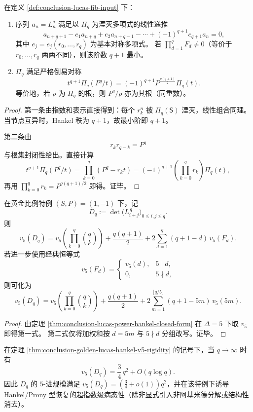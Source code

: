\begin{proposition}[最小递推与倒易对称]\label{prop:conclusion-lucas-power-minpoly-reciprocity}
在定义 \ref{def:conclusion-lucas-fib-input} 下：
\begin{enumerate}
  \item 序列 \(a_n=L_n^q\) 满足以 \(\Pi_q\) 为湮灭多项式的线性递推
  \[
  a_{n+q+1}
  -e_1 a_{n+q}
  +e_2 a_{n+q-1}
  -\cdots
  +(-1)^{q+1}e_{q+1}a_n=0,
  \]
  其中 \(e_j=e_j(r_0,\dots,r_q)\) 为基本对称多项式。
  若 \(\prod_{d=1}^{q}F_d\neq 0\)（等价于 \(r_0,\dots,r_q\) 两两不同），则该阶数 \(q+1\) 最小。
  \item \(\Pi_q\) 满足严格倒易对称
  \[
  t^{q+1}\Pi_q(P^q/t)
  =
  (-1)^{q+1}P^{\frac{q(q+1)}{2}}\Pi_q(t).
  \]
  等价地，若 \(\rho\) 为 \(\Pi_q\) 的根，则 \(P^q/\rho\) 亦为其根（同重数）。
\end{enumerate}
\end{proposition}
\begin{proof}
第一条由指数和表示直接得到：每个 \(r_k^n\) 被 \(\Pi_q(\mathsf S)\) 湮灭，线性组合同理。
当节点互异时，Hankel 秩为 \(q+1\)，故最小阶即 \(q+1\)。

第二条由
\[
r_k r_{q-k}=P^q
\]
与根集封闭性给出。直接计算
\[
t^{q+1}\Pi_q(P^q/t)
=\prod_{k=0}^{q}(P^q-r_kt)
=(-1)^{q+1}\left(\prod_{k=0}^{q}r_k\right)\Pi_q(t),
\]
再用
\(
\prod_{k=0}^{q}r_k=P^{q(q+1)/2}
\)
即得。证毕。
\end{proof}

\begin{theorem}\label{thm:conclusion-golden-lucas-hankel-v5-rigidity}
在黄金比例特例 \((S,P)=(1,-1)\) 下，记
\[
D_q:=\det\!\big(L_{i+j}^{\,q}\big)_{0\le i,j\le q}.
\]
则
\[
v_5(D_q)
=
v_5\!\left(\prod_{k=0}^{q}\binom{q}{k}\right)
+\frac{q(q+1)}{2}
+2\sum_{d=1}^{q}(q+1-d)\,v_5(F_d).
\]
若进一步使用经典恒等式
\[
v_5(F_d)=
\begin{cases}
v_5(d),&5\mid d,\\
0,&5\nmid d,
\end{cases}
\]
则可化为
\[
v_5(D_q)
=
v_5\!\left(\prod_{k=0}^{q}\binom{q}{k}\right)
+\frac{q(q+1)}{2}
+2\sum_{m=1}^{\lfloor q/5\rfloor}(q+1-5m)\,v_5(5m).
\]
\end{theorem}
\begin{proof}
由定理 \ref{thm:conclusion-lucas-power-hankel-closed-form} 在 \(\Delta=5\) 下取 \(v_5\) 即得第一式。
第二式仅将加权和按 \(d=5m\) 与 \(5\nmid d\) 分组改写。证毕。
\end{proof}

\begin{corollary}\label{cor:conclusion-golden-lucas-hankel-v5-quadratic-growth}
在定理 \ref{thm:conclusion-golden-lucas-hankel-v5-rigidity} 的记号下，当 \(q\to\infty\) 时有
\[
v_5(D_q)=\frac34\,q^2+O(q\log q).
\]
因此 \(D_q\) 的 \(5\)-进规模满足 \(v_5(D_q)=(\frac34+o(1))q^2\)，并在该特例下诱导 Hankel/Prony 型恢复的超指数级病态性（除非显式引入非阿基米德分解或结构性消去）。
\end{corollary}

